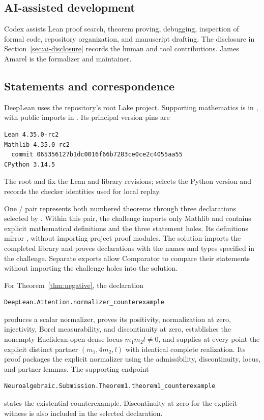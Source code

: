 \documentclass[mlmain]{jmlr}
\begin{document}
\subsection{AI-assisted development}

Codex assists Lean proof search, theorem proving, debugging, inspection of
formal code, repository organization, and manuscript drafting. The disclosure
in Section~\ref{sec:ai-disclosure} records the human and tool contributions.
James Amarel is the formalizer and maintainer. 
\subsection{Statements and correspondence}

DeepLean uses the repository's root Lake project. Supporting
mathematics is in , with public imports in
.  Its principal version pins are
\begin{lstlisting}
Lean 4.35.0-rc2
Mathlib 4.35.0-rc2
  commit 065356127b1dc0016f66b7283ce0ce2c4055aa55
CPython 3.14.5
\end{lstlisting}
The root  and  fix the Lean
and library revisions;  selects the
Python version and records the checker identities used for local replay.

One / pair represents both numbered
theorems through three declarations selected by .
Within this pair, the challenge imports only Mathlib and contains explicit
mathematical definitions and the three statement holes.  Its definitions mirror
, without importing project proof
modules.  The solution imports the completed library and proves declarations
with the names and types specified in the challenge.  Separate exports allow
Comparator to compare their statements without importing the challenge holes
into the solution.

For Theorem~\ref{thm:negative}, the declaration
\begin{lstlisting}
DeepLean.Attention.normalizer_counterexample
\end{lstlisting}
produces a scalar normalizer, proves its positivity,
normalization at zero, injectivity, Borel measurability, and discontinuity at
zero, establishes the
nonempty Euclidean-open dense locus $m_1m_2l\ne0$, and supplies at every point
the explicit distinct partner $(m_1,4m_2,l)$ with identical complete
realization. Its proof packages the explicit normalizer using the
admissibility, discontinuity, locus, and partner lemmas. The supporting endpoint
\begin{lstlisting}
Neuroalgebraic.Submission.Theorem1.theorem1_counterexample
\end{lstlisting}
states the existential counterexample. Discontinuity at zero for the explicit witness is also included in the
selected declaration.
\end{document}
